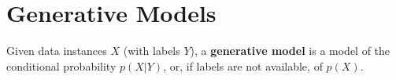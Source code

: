 %
%
%

\chapter{Generative Models}\label{chap:generative_models}
\enlargethispage{2ex}
\vspace*{-2pt}

\enlargethispage{2ex}

Given data instances $X$ (with labels $Y$), a \textbf{generative model} is a model of the conditional probability $p(X | Y)$, or, if labels are not available, of $p(X)$.

%
